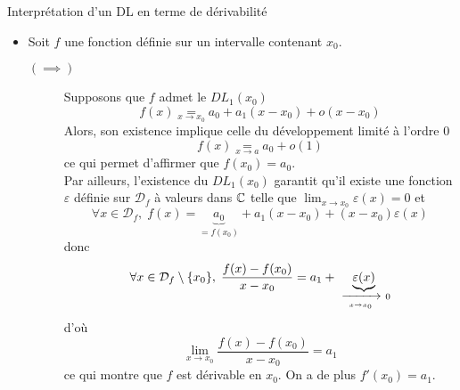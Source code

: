 \documentclass{article}
\date{08 Février 2024}
\begin{document}
\maketitle

\begin{question_kholle}{Interprétation d’un DL en terme de dérivabilité}
	\hfill\\
	\begin{itemize}[label=$\vartriangleright$]
		\item Soit $f$ une fonction définie sur un intervalle contenant $x_{0}$.
		      \begin{description}
			      \item[$(\implies)$] Supposons que $f$ admet le $DL_{1}(x_{0})$
			            \[
				            f(x)\underset{x\to x_{0}}{=} a_{0} + a_{1}(x-x_{0})+o(x-x_{0})
			            \]
			            Alors, son existence implique celle du développement limité à l’ordre 0
			            \[
				            f(x)\underset{x \rightarrow a}{=} a_{0}+o(1)
			            \]
			            ce qui permet d’affirmer que $f(x_{0})=a_{0}$.\\
			            Par ailleurs, l’existence du $DL_{1}(x_{0})$ garantit qu’il existe une fonction $\varepsilon$ définie sur $\mathcal{D}_{f}$ à valeurs dans $\mathbb C$ telle que $\lim_{x\to x_{0}}\varepsilon(x)=0$ et
			            \[
				            \forall x\in \mathcal{D}_{f} ,\; f(x)=\underbrace{a_{0}}_{=f(x_{0})} + a_{1}(x-x_{0}) + (x-x_{0})\varepsilon (x)
			            \]
			            donc
			            \[
				            \forall x\in \mathcal{D}_{f}\setminus \{x_{0}\},\; \frac{f(x)-f(x_{0})}{x-x_{0}}=a_{1}+\underbrace{\varepsilon(x)}_{\ \xrightarrow[\;x \to x_{0}\;]{}\ 0}
			            \]
			            d’où
			            \[
				            \lim_{x\to x_{0}}\frac{f(x)-f(x_{0})}{x-x_{0}}=a_{1}
			            \]
			            ce qui montre que $f$ est dérivable en $x_{0}$. On a de plus $f'(x_{0})=a_{1}$.


\end{description}
\end{itemize}
\end{question_kholle}
\end{document}
